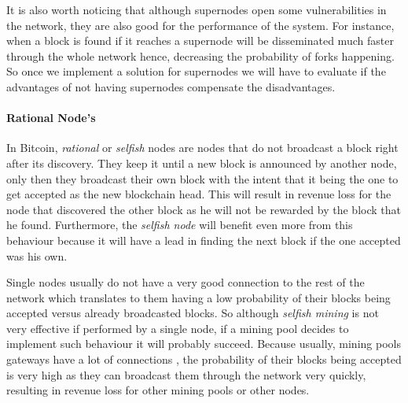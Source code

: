 It is also worth noticing that although supernodes open some vulnerabilities in the network, they are also good for the performance of the system. For instance, when a block is found if it reaches a supernode will be disseminated much faster through the whole network hence, decreasing the probability of forks happening. So once we implement a solution for supernodes we will have to evaluate if the advantages of not having supernodes compensate the disadvantages.

\paragraph*{\textbf{Rational Node's}} In Bitcoin, \textit{rational} or \textit{selfish} nodes are nodes that do not broadcast a block right after its discovery. They keep it until a new block is announced by another node, only then they broadcast their own block with the intent that it being the one to get accepted as the new blockchain head. This will result in revenue loss for the node that discovered the other block as he will not be rewarded by the block that he found. Furthermore, the \textit{selfish node} will benefit even more from this behaviour because it will have a lead in finding the next block if the one accepted was his own.

Single nodes usually do not have a very good connection to the rest of the network which translates to them having a low probability of their blocks being accepted versus already broadcasted blocks. So although \textit{selfish mining} is not very effective if performed by a single node, if a mining pool decides to implement such behaviour it will probably succeed. Because usually, mining pools gateways have a lot of connections \cite{miller2015discovering}, the probability of their blocks being accepted is very high as they can broadcast them through the network very quickly, resulting in revenue loss for other mining pools or other nodes.






